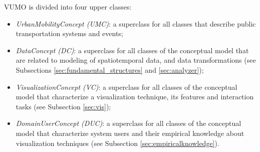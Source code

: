\documentclass[]{interact}
\theoremstyle{plain}%
\theoremstyle{definition}
\theoremstyle{remark}
\theoremstyle{definition}
\begin{document}




VUMO is divided into four upper classes:

\begin{itemize}
\item \emph{UrbanMobilityConcept (UMC)}: a superclass for all classes that describe public transportation systems and events;
\item \emph{DataConcept (DC)}: a superclass for all classes of the conceptual model that are related to modeling of spatiotemporal data, and data transformations (see Subsections \ref{sec:fundamental_structures} and \ref{sec:analyzer});
\item \emph{VisualizationConcept (VC)}: a superclass for all classes of the conceptual model that characterize a visualization technique, its features and interaction tasks (see Subsection \ref{sec:vis});
\item \emph{DomainUserConcept (DUC)}: a superclass for all classes of the conceptual model that characterize system users and their empirical knowledge about visualization techniques (see Subsection \ref{sec:empiricalknowledge}).
\end{itemize}
\end{document}
